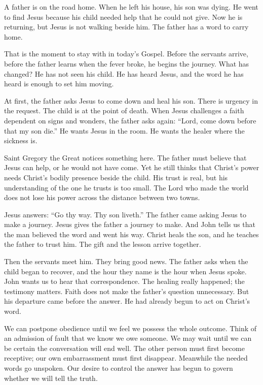 A father is on the road home. When he left his house, his son was dying.
He went to find Jesus because his child needed help that he could not
give. Now he is returning, but Jesus is not walking beside him.
The father has a word to carry home.

That is the moment to stay with in today's Gospel. Before the servants
arrive, before the father learns when the fever broke, he begins the
journey. What has changed? He has not seen his child. He has heard
Jesus, and the word he has heard is enough to set him moving.

At first, the father asks Jesus to come down and heal his son.
There is urgency in the request. The child is at the point of death.
When Jesus challenges a faith dependent on signs and wonders, the
father asks again: ``Lord, come down before that my son die.''
He wants Jesus in the room. He wants the healer where the sickness is.

Saint Gregory the Great notices something here. The father must believe
that Jesus can help, or he would not have come. Yet he still thinks
that Christ's power needs Christ's bodily presence beside the child.
His trust is real, but his understanding of the one he trusts is too
small. The Lord who made the world does not lose his power across the
distance between two towns.

Jesus answers: ``Go thy way. Thy son liveth.'' The father came asking
Jesus to make a journey. Jesus gives the father a journey to make.
And John tells us that the man believed the word and went his way.
Christ heals the son, and he teaches the father to trust him.
The gift and the lesson arrive together.

Then the servants meet him. They bring good news. The father asks
when the child began to recover, and the hour they name is the hour
when Jesus spoke. John wants us to hear that correspondence. The
healing really happened; the testimony matters. Faith does not make
the father's question unnecessary. But his departure came before
the answer. He had already begun to act on Christ's word.

We can postpone obedience until we feel we possess the whole outcome.
Think of an admission of fault that we know we owe someone. We may
wait until we can be certain the conversation will end well. The
other person must first become receptive; our own embarrassment must
first disappear. Meanwhile the needed words go unspoken. Our desire
to control the answer has begun to govern whether we will tell the truth.


